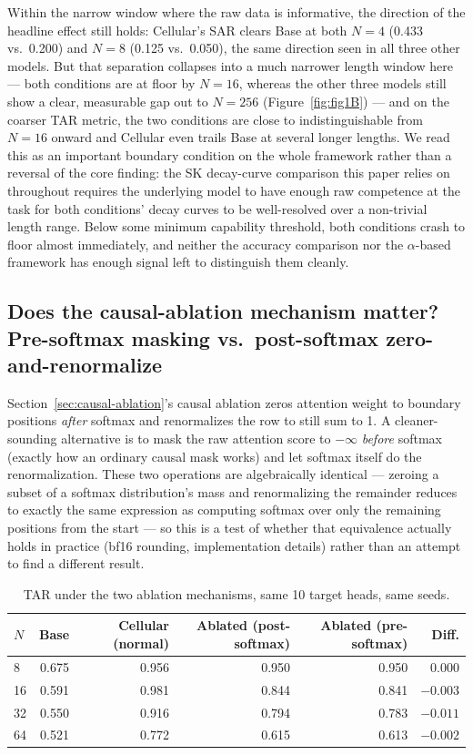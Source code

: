 \documentclass[11pt]{article}
\begin{document}
Within the narrow window where the raw data is informative, the direction of the headline effect still holds: Cellular's SAR clears Base at both $N=4$ (0.433 vs.\ 0.200) and $N=8$ (0.125 vs.\ 0.050), the same direction seen in all three other models. But that separation collapses into a much narrower length window here --- both conditions are at floor by $N=16$, whereas the other three models still show a clear, measurable gap out to $N=256$ (Figure~\ref{fig:fig1B}) --- and on the coarser TAR metric, the two conditions are close to indistinguishable from $N=16$ onward and Cellular even trails Base at several longer lengths. We read this as an important boundary condition on the whole framework rather than a reversal of the core finding: the SK decay-curve comparison this paper relies on throughout requires the underlying model to have enough raw competence at the task for both conditions' decay curves to be well-resolved over a non-trivial length range. Below some minimum capability threshold, both conditions crash to floor almost immediately, and neither the accuracy comparison nor the $\alpha$-based framework has enough signal left to distinguish them cleanly.

\subsection{Does the causal-ablation mechanism matter? Pre-softmax masking vs.\ post-softmax zero-and-renormalize}

Section~\ref{sec:causal-ablation}'s causal ablation zeros attention weight to boundary positions \emph{after} softmax and renormalizes the row to still sum to 1. A cleaner-sounding alternative is to mask the raw attention score to $-\infty$ \emph{before} softmax (exactly how an ordinary causal mask works) and let softmax itself do the renormalization. These two operations are algebraically identical --- zeroing a subset of a softmax distribution's mass and renormalizing the remainder reduces to exactly the same expression as computing softmax over only the remaining positions from the start --- so this is a test of whether that equivalence actually holds in practice (bf16 rounding, implementation details) rather than an attempt to find a different result.

\begin{table}[htbp]
\centering
\small
\begin{tabular}{lrrrrr}
\toprule
$N$ & Base & Cellular (normal) & Ablated (post-softmax) & Ablated (pre-softmax) & Diff. \\
\midrule
8  & 0.675 & 0.956 & 0.950 & 0.950 & 0.000 \\
16 & 0.591 & 0.981 & 0.844 & 0.841 & $-0.003$ \\
32 & 0.550 & 0.916 & 0.794 & 0.783 & $-0.011$ \\
64 & 0.521 & 0.772 & 0.615 & 0.613 & $-0.002$ \\
\bottomrule
\end{tabular}
\caption{TAR under the two ablation mechanisms, same 10 target heads, same seeds.}
\end{table}
\end{document}
